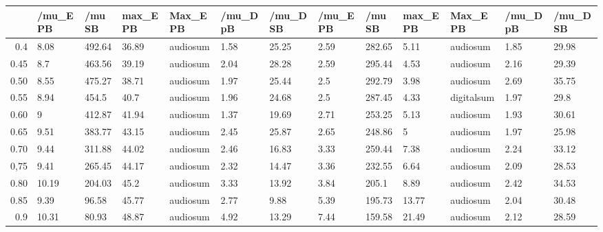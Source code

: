 \begin{table}[ht]
\centering
\begin{tabular}{rllllllllllll}
  \hline
 & /mu\_E PB & /mu SB & max\_E PB & Max\_E PB & /mu\_D pB & /mu\_D SB & /mu\_E PB & /mu SB & max\_E PB & Max\_E PB & /mu\_D pB & /mu\_D SB \\ 
  \hline
0.4 & 8.08 & 492.64 & 36.89 & audiosum & 1.58 & 25.25 & 2.59 & 282.65 & 5.11 & audiosum & 1.85 & 29.98 \\ 
  0.45 & 8.7 & 463.56 & 39.19 & audiosum & 2.04 & 28.28 & 2.59 & 295.44 & 4.53 & audiosum & 2.16 & 29.39 \\ 
  0.50 & 8.55 & 475.27 & 38.71 & audiosum & 1.97 & 25.44 & 2.5 & 292.79 & 3.98 & audiosum & 2.69 & 35.75 \\ 
  0.55 & 8.94 & 454.5 & 40.7 & audiosum & 1.96 & 24.68 & 2.5 & 287.45 & 4.33 & digitalsum & 1.97 & 29.8 \\ 
  0.60 & 9 & 412.87 & 41.94 & audiosum & 1.37 & 19.69 & 2.71 & 253.25 & 5.13 & audiosum & 1.93 & 30.61 \\ 
  0.65 & 9.51 & 383.77 & 43.15 & audiosum & 2.45 & 25.87 & 2.65 & 248.86 & 5 & audiosum & 1.97 & 25.98 \\ 
  0.70 & 9.44 & 311.88 & 44.02 & audiosum & 2.46 & 16.83 & 3.33 & 259.44 & 7.38 & audiosum & 2.24 & 33.12 \\ 
  0,75 & 9.41 & 265.45 & 44.17 & audiosum & 2.32 & 14.47 & 3.36 & 232.55 & 6.64 & audiosum & 2.09 & 28.53 \\ 
  0.80 & 10.19 & 204.03 & 45.2 & audiosum & 3.33 & 13.92 & 3.84 & 205.1 & 8.89 & audiosum & 2.42 & 34.53 \\ 
  0.85 & 9.39 & 96.58 & 45.77 & audiosum & 2.77 & 9.88 & 5.39 & 195.73 & 13.77 & audiosum & 2.04 & 30.48 \\ 
  0.9 & 10.31 & 80.93 & 48.87 & audiosum & 4.92 & 13.29 & 7.44 & 159.58 & 21.49 & audiosum & 2.12 & 28.59 \\ 
   \hline
\end{tabular}
\end{table}
